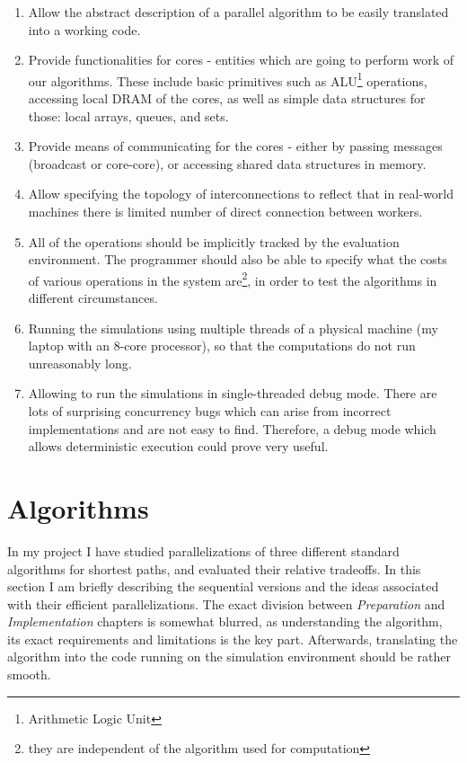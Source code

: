 \documentclass[12pt,a4paper,twoside,openright]{report}
\begin{document}
\begin{enumerate}
    \item Allow the abstract description of a parallel algorithm to be easily translated into a working code.
    \item Provide functionalities for cores - entities which are going to perform work of our algorithms. These include basic primitives such as ALU\footnote{Arithmetic Logic Unit} operations, accessing local DRAM of the cores, as well as simple data structures for those: local arrays, queues, and sets. 
    \item Provide means of communicating for the cores - either by passing messages (broadcast or core-core), or accessing shared data structures in memory.
    \item Allow specifying the topology of interconnections to reflect that in real-world machines there is limited number of direct connection between workers.
    \item All of the operations should be implicitly tracked by the evaluation environment. The programmer should also be able to specify what the costs of various operations in the system are\footnote{they are independent of the algorithm used for computation}, in order to test the algorithms in different circumstances.
    \item Running the simulations using multiple threads of a physical machine (my laptop with an $8$-core processor), so that the computations do not run unreasonably long.
    \item Allowing to run the simulations in single-threaded debug mode. There are lots of surprising concurrency bugs which can arise from incorrect implementations and are not easy to find. Therefore, a debug mode which allows deterministic execution could prove very useful.
\end{enumerate}

\section{Algorithms}
In my project I have studied parallelizations of three different standard algorithms for shortest paths, and evaluated their relative tradeoffs. In this section I am briefly describing the sequential versions and the ideas associated with their efficient parallelizations. The exact division between \textit{Preparation} and \textit{Implementation} chapters is somewhat blurred, as understanding the algorithm, its exact requirements and limitations is the key part. Afterwards, translating the algorithm into the code running on the simulation environment should be rather smooth.
\end{document}
